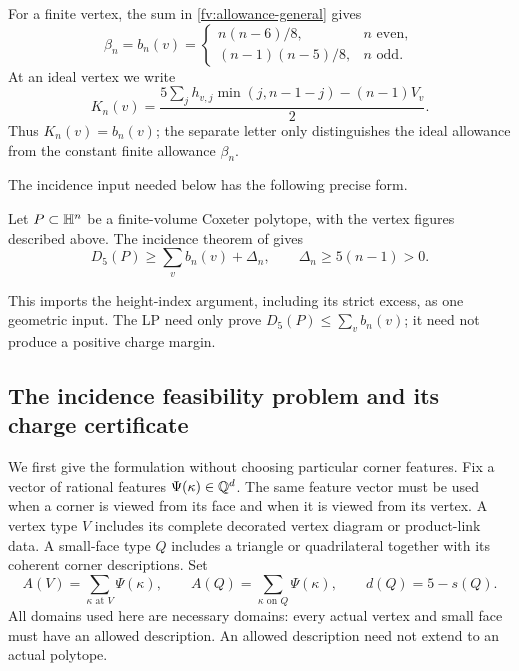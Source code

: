 For a finite vertex, the sum in \eqref{fv:allowance-general} gives
\begin{equation}\label{fv:finite-allowance}
 \beta_n=b_n(v)=
 \begin{cases}
 n(n-6)/8,&n\text{ even},\\
 (n-1)(n-5)/8,&n\text{ odd}.
 \end{cases}
\end{equation}
At an ideal vertex we write
\begin{equation}\label{fv:ideal-allowance}
 K_n(v)=\frac{5\sum_jh_{v,j}\min(j,n-1-j)-(n-1)V_v}{2}.
\end{equation}
Thus $K_n(v)=b_n(v)$; the separate letter only distinguishes the
ideal allowance from the constant finite allowance $\beta_n$.

The incidence input needed below has the following precise form.

\begin{assumption}\label{fv:incidence-excess}
Let $P\subset\mathbb H^n$ be a finite-volume Coxeter polytope, with the
vertex figures described above. The incidence theorem of
\cite{BoundsSupplement} gives
\begin{equation}\label{fv:incidence-excess-eq}
 D_5(P)\ge\sum_v b_n(v)+\Delta_n,
 \qquad \Delta_n\ge5(n-1)>0.
\end{equation}
\end{assumption}

This imports the height-index argument, including its strict excess,
as one geometric input. The LP need only prove
$D_5(P)\le\sum_vb_n(v)$; it need not produce a positive charge margin.

\subsection{The incidence feasibility problem and its charge certificate}
\label{fv:incidence-primal}

We first give the formulation without choosing particular corner
features. Fix a vector of rational features $\Psi(\kappa)\in\mathbb Q^d$.
The same feature vector must be used when a corner is viewed from its
face and when it is viewed from its vertex. A vertex type $V$ includes
its complete decorated vertex diagram or product-link data. A small-face
type $Q$ includes a triangle or quadrilateral together with its coherent
corner descriptions. Set
\begin{equation}\label{fv:feature-sums}
 A(V)=\sum_{\kappa\text{ at }V}\Psi(\kappa),\qquad
 A(Q)=\sum_{\kappa\text{ on }Q}\Psi(\kappa),\qquad
 d(Q)=5-s(Q).
\end{equation}
All domains used here are necessary domains: every actual vertex and
small face must have an allowed description. An allowed description
need not extend to an actual polytope.

